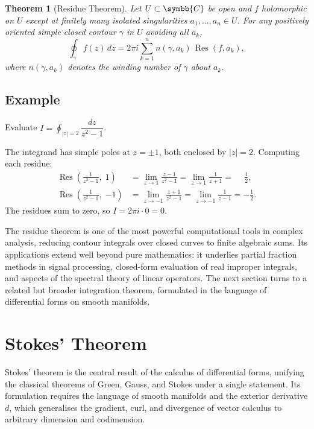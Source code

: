 \documentclass{article}
\newtheorem{theorem}{Theorem}[section]
\begin{document}
\begin{theorem}[Residue Theorem]
  Let $U \subset \symbb{C}$ be open and $f$ holomorphic on $U$ except at finitely many
  isolated singularities $a_1, \ldots, a_n \in U$.  For any positively oriented simple
  closed contour $\gamma$ in $U$ avoiding all $a_k$,
  \begin{equation}
    \oint_{\gamma} f(z)\,dz
      = 2\pi i \sum_{k=1}^{n} n(\gamma, a_k)\,\operatorname{Res}(f, a_k),
  \end{equation}
  where $n(\gamma, a_k)$ denotes the winding number of $\gamma$ about $a_k$.
\end{theorem}

\subsection{Example}

Evaluate $\displaystyle I = \oint_{|z|=2} \dfrac{dz}{z^{2} - 1}$.

The integrand has simple poles at $z = \pm 1$, both enclosed by $|z| = 2$. Computing
each residue:
\begin{align}
  \operatorname{Res}\!\left(\tfrac{1}{z^{2}-1},\; 1\right)
    &= \lim_{z \to 1}  \frac{z - 1}{z^{2}-1}
     = \lim_{z \to 1}  \frac{1}{z+1}
     = \phantom{-}\frac{1}{2}, \\[4pt]
  \operatorname{Res}\!\left(\tfrac{1}{z^{2}-1},\; {-1}\right)
    &= \lim_{z \to -1} \frac{z + 1}{z^{2}-1}
     = \lim_{z \to -1} \frac{1}{z-1}
     = -\frac{1}{2}.
\end{align}
The residues sum to zero, so $I = 2\pi i \cdot 0 = 0$.

The residue theorem is one of the most powerful computational tools in complex
analysis, reducing contour integrals over closed curves to finite algebraic sums.
Its applications extend well beyond pure mathematics: it underlies partial fraction
methods in signal processing, closed-form evaluation of real improper integrals,
and aspects of the spectral theory of linear operators. The next section turns to
a related but broader integration theorem, formulated in the language of differential
forms on smooth manifolds.

\section{Stokes' Theorem}

Stokes' theorem is the central result of the calculus of differential forms,
unifying the classical theorems of Green, Gauss, and Stokes under a single statement.
Its formulation requires the language of smooth manifolds and the exterior derivative
$d$, which generalises the gradient, curl, and divergence of vector calculus to
arbitrary dimension and codimension.
\end{document}
